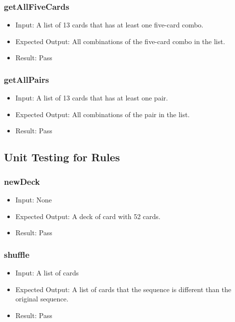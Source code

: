 \documentclass[12pt, titlepage]{article}
\begin{document}
\subsubsection{getAllFiveCards}
\begin{itemize}
    \item Input: A list of 13 cards that has at least one five-card combo.
    \item Expected Output: All combinations of the five-card combo in the list.
    \item Result: Pass
\end{itemize}

\subsubsection{getAllPairs}
\begin{itemize}
    \item Input: A list of 13 cards that has at least one pair.
    \item Expected Output: All combinations of the pair in the list.
    \item Result: Pass
\end{itemize}

\subsection{Unit Testing for Rules}
\subsubsection{newDeck}
\begin{itemize}
    \item Input: None
    \item Expected Output: A deck of card with 52 cards.
    \item Result: Pass
\end{itemize}

\subsubsection{shuffle}
\begin{itemize}
    \item Input: A list of cards
    \item Expected Output: A list of cards that the sequence is different than the original sequence.
    \item Result: Pass
\end{itemize}
\end{document}
